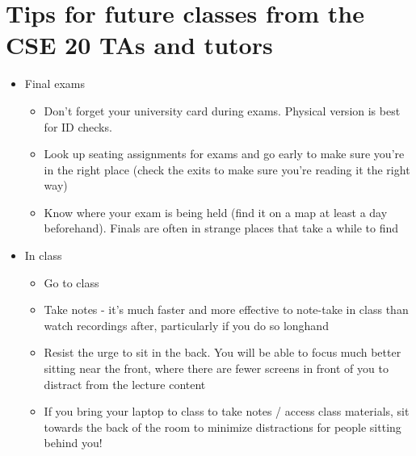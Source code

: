 \section*{Tips for future classes from the CSE 20 TAs and tutors}
\begin{itemize}
\item Final exams
\begin{itemize}
\item Don't forget your university card during exams. Physical version is best for ID checks.
\item Look up seating assignments for exams and go early to make sure you're in the right place (check the exits to make sure you're reading it the right way) 
\item Know where your exam is being held (find it on a map at least a day beforehand). Finals are often in strange places that take a while to find 
\end{itemize} \item In class
\begin{itemize}
\item Go to class
\item Take notes - it's much faster and more effective to note-take in class than watch recordings after, particularly if you do so longhand
\item Resist the urge to sit in the back. You will be able to focus much better sitting near the front, where there are fewer screens in front of you to distract from the lecture content
\item If you bring your laptop to class to take notes / access class materials, sit towards the back of the room to minimize distractions for people sitting behind you!

\end{itemize}
\end{itemize}
